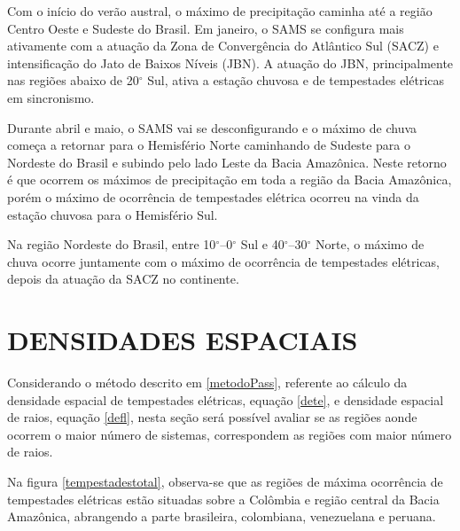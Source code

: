 Com o início do verão austral, o máximo de precipitação caminha até a região Centro Oeste e Sudeste do Brasil. Em janeiro, o SAMS se configura mais ativamente com a atuação da Zona de Convergência do Atlântico Sul (SACZ)  e intensificação do Jato de Baixos Níveis (JBN).  A atuação do JBN, principalmente nas regiões abaixo de 20$^{\circ}$ Sul, ativa a estação chuvosa e de tempestades elétricas em sincronismo. 

Durante abril e maio, o SAMS vai se desconfigurando e o máximo de chuva começa a retornar para o Hemisfério Norte caminhando de Sudeste para o Nordeste do Brasil e subindo pelo lado Leste da Bacia Amazônica. Neste retorno é que ocorrem os máximos de precipitação em toda a região da Bacia Amazônica, porém o máximo de ocorrência de tempestades elétrica ocorreu na vinda da estação chuvosa para o Hemisfério Sul.

Na região Nordeste do Brasil, entre 10$^{\circ}$--0$^{\circ}$ Sul e 40$^{\circ}$--30$^{\circ}$ Norte, o máximo de chuva ocorre juntamente com o máximo de ocorrência de tempestades elétricas, depois da atuação da SACZ no continente.


\section{DENSIDADES ESPACIAIS}

Considerando o método descrito em \ref{metodoPass}, referente ao cálculo da densidade espacial de tempestades elétricas, equação \ref{dete}, e densidade espacial de raios, equação \ref{defl}, nesta seção será possível avaliar se as regiões aonde ocorrem o maior número de sistemas, correspondem as regiões com maior número de raios.

Na figura \ref{tempestadestotal}, observa-se que as regiões de máxima ocorrência de tempestades elétricas estão situadas sobre a Colômbia e região central da Bacia Amazônica, abrangendo a parte brasileira, colombiana, venezuelana e peruana.



